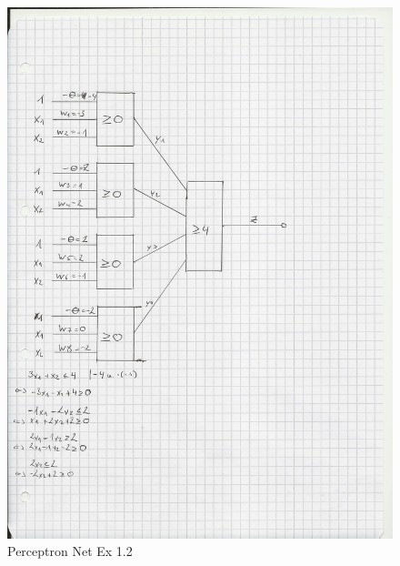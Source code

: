 \documentclass{scrartcl}
\begin{document}
\begin{figure}[ht]
\begin{center}
\includegraphics[scale=0.7]{Attachment4.jpg}
\end{center}
\caption{Perceptron Net Ex 1.2}
\label{Img:Exercise 1.2}
\end{figure}
\end{document}

